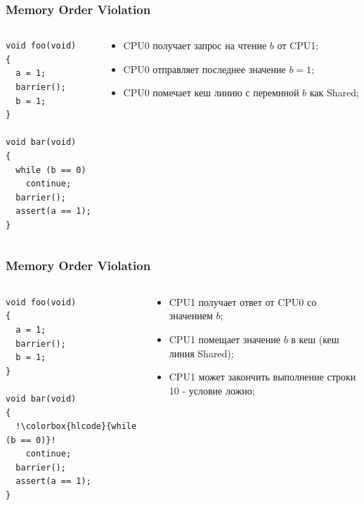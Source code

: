 \begin{frame}[fragile]
\frametitle{Memory Order Violation}

\begin{columns}[T]
  \begin{column}{.4\linewidth}
    \begin{lstlisting}[escapechar=!]
void foo(void)
{
  a = 1;
  barrier();
  b = 1;
}

void bar(void)
{
  while (b == 0)
    continue;
  barrier();
  assert(a == 1);
}
    \end{lstlisting}
  \end{column}
  \begin{column}{.6\linewidth}
    \begin{itemize}
      \item CPU0 получает запрос на чтение $b$ от CPU1;
      \item CPU0 отправляет последнее значение $b = 1$;
      \item CPU0 помечает кеш линию с перемнной $b$ как Shared;
    \end{itemize}
  \end{column}
\end{columns}
\end{frame}

\begin{frame}[fragile]
\frametitle{Memory Order Violation}

\begin{columns}[T]
  \begin{column}{.4\linewidth}
    \begin{lstlisting}[escapechar=!]
void foo(void)
{
  a = 1;
  barrier();
  b = 1;
}

void bar(void)
{
  !\colorbox{hlcode}{while (b == 0)}!
    continue;
  barrier();
  assert(a == 1);
}
    \end{lstlisting}
  \end{column}
  \begin{column}{.6\linewidth}
    \begin{itemize}
      \item CPU1 получает ответ от CPU0 со значением $b$;
      \item CPU1 помещает значение $b$ в кеш (кеш линия Shared);
      \item CPU1 может закончить выполнение строки 10 - условие ложно;
    \end{itemize}
  \end{column}
\end{columns}
\end{frame}

